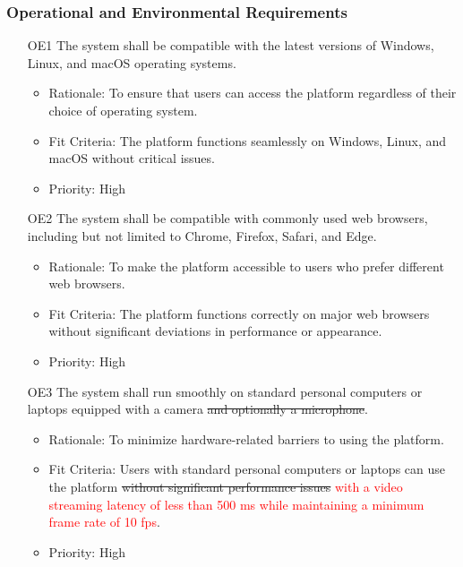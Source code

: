 \documentclass[12pt]{article}
\begin{document}
\subsubsection{Operational and Environmental Requirements}
\begin{itemize}
    \item[OE1] The system shall be compatible with the latest versions of Windows, Linux, and macOS operating systems. \label{OE1}
    \begin{itemize}
        \item Rationale: To ensure that users can access the platform regardless of their choice of operating system.
        \item Fit Criteria: The platform functions seamlessly on Windows, Linux, and macOS without critical issues.
        \item Priority: High
    \end{itemize}
\end{itemize}
\begin{itemize}
    \item[OE2] The system shall be compatible with commonly used web browsers, including but not limited to Chrome, Firefox, Safari, and Edge. \label{OE2}
    \begin{itemize}
        \item Rationale: To make the platform accessible to users who prefer different web browsers.
        \item Fit Criteria: The platform functions correctly on major web browsers without significant deviations in performance or appearance.
        \item Priority: High
    \end{itemize}
\end{itemize}
\begin{itemize}
    \item[OE3] The system shall run smoothly on standard personal computers or laptops equipped with a camera \sout{and optionally a microphone}. \label{OE3}
    \begin{itemize}
        \item Rationale: To minimize hardware-related barriers to using the platform.
        \item Fit Criteria: Users with standard personal computers or laptops can use the platform \sout{without significant performance issues}
        \textcolor{red}{with a video streaming latency of less than 500 ms while maintaining a minimum frame rate of 10 fps}.
        \item Priority: High
    \end{itemize}
\end{itemize}
\end{document}
